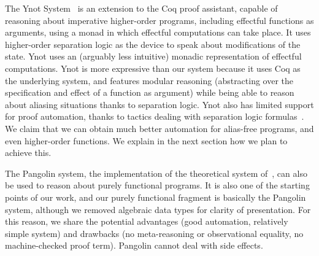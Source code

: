 \documentclass[a4paper]{llncs}
\begin{document}
The Ynot System~\cite{Nanevski08Awkward,chlipalaicfp09} is an extension to the
Coq proof assistant, capable of reasoning about imperative higher-order
programs, including effectful functions as arguments, using a monad in which
effectful computations can take place. It uses higher-order separation logic
as the device to speak about modifications of the state. Ynot uses an
(arguably less intuitive) monadic representation of effectful computations.
Ynot is more expressive than our system because it uses Coq as the underlying
system, and features modular reasoning (abstracting over the specification and
effect of a function as argument) while being able to reason about aliasing
situations thanks to separation logic. Ynot also has limited support for
proof automation, thanks to tactics dealing with separation logic
formulas~\cite{chlipalaicfp09}. We claim that we can obtain much better
automation for alias-free programs, and even higher-order functions. We
explain in the next section how we plan to achieve this.



The Pangolin system, the implementation of the theoretical system
of~\cite{regis-gianas-pottier-08}, can also be used to reason about
purely functional programs. It is also one of the starting points of
our work, and our purely functional fragment is basically the Pangolin
system, although we removed algebraic data types for clarity of
presentation. For this reason, we share the potential advantages (good
automation, relatively simple system) and drawbacks (no
meta-reasoning or observational equality, no machine-checked proof
term). Pangolin cannot deal with side effects.
\end{document}
